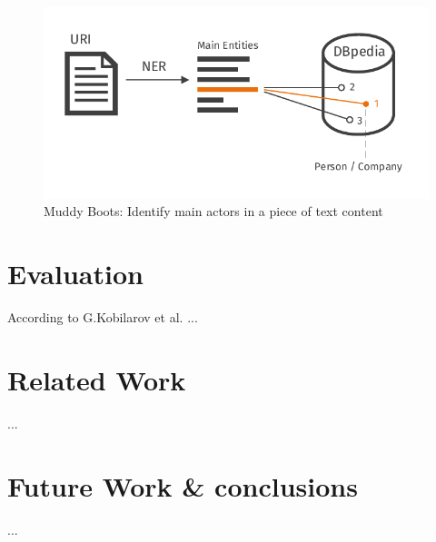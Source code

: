 \documentclass{llncs}
\begin{document}
\begin{figure}[!h]
  \includegraphics[width=\textwidth]{images/muddy_boots_dark}
  \caption{Muddy Boots: Identify main actors in a piece of text content}
  \label{fig:muddy}
\end{figure}
%
\section{Evaluation}
%
According to G.Kobilarov et al. \cite{mmsw} ...
%
\section{Related Work}
%
...
%
\section{Future Work \& conclusions}
%
...

%
%
%
\end{document}
